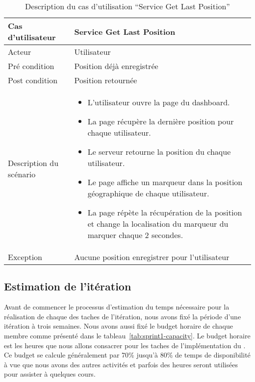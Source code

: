 \begin{table}[H]
    \centering
    \begin{tabular}{| p{3cm} | l |}
        \hline
        Cas d'utilisateur & Service Get Last Position \\ \hline
        Acteur & Utilisateur \\ \hline
        Pré condition & Position déjà enregistrée \\ \hline
        Post condition & Position retournée \\ \hline
        Description du scénario &
        \begin{minipage}{11cm}
            \vspace*{0.2cm}
            \begin{itemize}
                \item L'utilisateur ouvre la page du dashboard.
                \item La page récupère la dernière position pour chaque utilisateur.
                \item Le serveur retourne la position du chaque utilisateur.
                \item Le page affiche un marqueur dans la position géographique de chaque utilisateur.
                \item La page répète la récupération de la position et change la localisation du marqueur du marquer chaque 2 secondes.
            \end{itemize}
            \vspace{0.1cm}
        \end{minipage} \\ \hline
        Exception & Aucune position enregistrer pour l'utilisateur \\ \hline
    \end{tabular}
    \caption{Description du cas d'utilisation ``Service Get Last Position''}
\end{table}

\subsection{Estimation de l'itération}

Avant de commencer le processus d'estimation du temps nécessaire pour la
réalisation de chaque des taches de l'itération, nous avons fixé la période
d'une itération à trois semaines. Nous avons aussi fixé le budget horaire de
chaque membre comme présenté dans le tableau~\ref{tab:sprint1-capacity}. Le
budget horaire est les heures que nous allons consacrer pour les taches de
l'implémentation du . Ce budget se calcule généralement
par 70\% jusqu'à 80\% de temps de disponibilité à 
vue que nous avons des autres activités et parfois des heures seront utilisées
pour assister à quelques cours.

